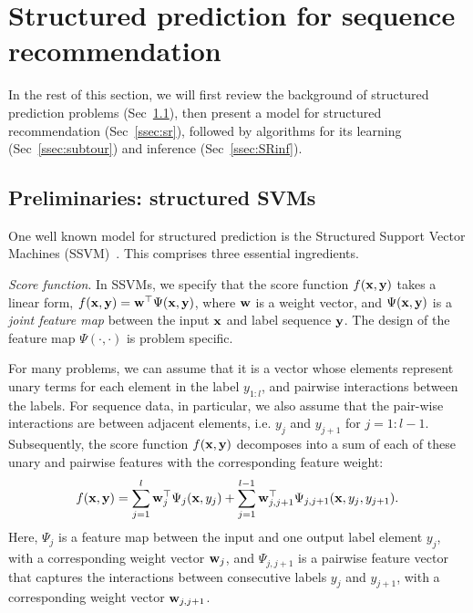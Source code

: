 \secmoveup
\section{Structured prediction for sequence recommendation}
\label{sec:recseq}
\textmoveup

In the rest of this section, we will first review the background of structured prediction problems (Sec~\ref{ssec:ssvm}), then present a model for structured recommendation (Sec~\ref{ssec:sr}), followed by algorithms for its learning (Sec~\ref{ssec:subtour}) and inference (Sec~\ref{ssec:SRinf}).


\secmoveup
\subsection{Preliminaries: structured SVMs}
\label{ssec:ssvm}
\textmoveup

One well known model for structured prediction is the Structured Support Vector Machines (SSVM)~\cite{joachims2009predicting,tsochantaridis2005large}.
This comprises three essential ingredients.

\emph{Score function}. In SSVMs, we specify that the score function $f(\mathbf{x}, \mathbf{y})$ takes a linear form, \ie 
$f(\mathbf{x}, \mathbf{y}) = \mathbf{w}^\top \Psi(\mathbf{x}, \mathbf{y})$,
where $\mathbf{w}$ is a weight vector, and $\Psi(\mathbf{x}, \mathbf{y})$ is a \emph{joint feature map}
between the input $\mathbf{x}$ and label sequence $\mathbf{y}$.
The design of the feature map $\Psi(\cdot,\cdot)$ is problem specific.

For many problems, we can assume that it is a vector whose elements represent unary
terms for each element in the label $y_{1:l}$, and pairwise interactions between the labels.
For sequence data, in particular, we also assume that the pair-wise interactions are between
adjacent elements, i.e. $y_j$ and $y_{j+1}$ for $j=1:l-1$.
Subsequently, the score function $f(\mathbf{x},\mathbf{y})$ decomposes into a sum of
each of these unary and pairwise features with the corresponding feature weight:
\begin{equation}
\label{eq:jointfeature}
f(\mathbf{x}, \mathbf{y}) =  \sum_{j=1}^l \mathbf{w}_j^\top \Psi_j(\mathbf{x}, y_j) + \sum_{j=1}^{l-1} \mathbf{w}_{j,j+1}^\top \Psi_{j,j+1}(\mathbf{x}, y_{j}, y_{j+1}).
\end{equation}
Here, $\Psi_j$ is a feature map between the input and one output label element $y_j$, with a corresponding weight vector $\mathbf{w}_j$,
and $\Psi_{j,j+1}$ is a pairwise feature vector that captures the interactions between consecutive labels $y_j$ and $y_{j+1}$,
with a corresponding weight vector $\mathbf{w}_{j,j+1}$.

